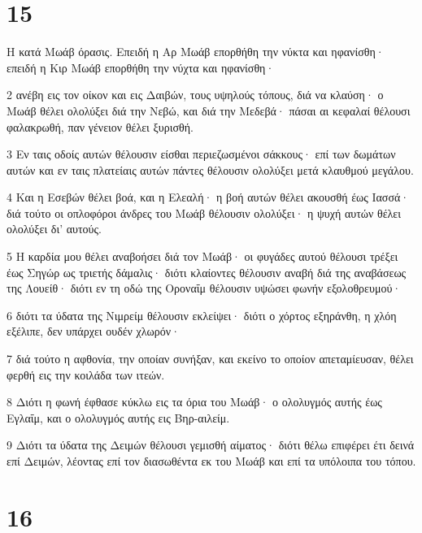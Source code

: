 \chapter{15}

\par Η κατά Μωάβ όρασις. Επειδή η Αρ Μωάβ επορθήθη την νύκτα και ηφανίσθη· επειδή η Κιρ Μωάβ επορθήθη την νύχτα και ηφανίσθη·
\par 2 ανέβη εις τον οίκον και εις Δαιβών, τους υψηλούς τόπους, διά να κλαύση· ο Μωάβ θέλει ολολύξει διά την Νεβώ, και διά την Μεδεβά· πάσαι αι κεφαλαί θέλουσι φαλακρωθή, παν γένειον θέλει ξυρισθή.
\par 3 Εν ταις οδοίς αυτών θέλουσιν είσθαι περιεζωσμένοι σάκκους· επί των δωμάτων αυτών και εν ταις πλατείαις αυτών πάντες θέλουσιν ολολύξει μετά κλαυθμού μεγάλου.
\par 4 Και η Εσεβών θέλει βοά, και η Ελεαλή· η βοή αυτών θέλει ακουσθή έως Ιασσά· διά τούτο οι οπλοφόροι άνδρες του Μωάβ θέλουσιν ολολύξει· η ψυχή αυτών θέλει ολολύξει δι' αυτούς.
\par 5 Η καρδία μου θέλει αναβοήσει διά τον Μωάβ· οι φυγάδες αυτού θέλουσι τρέξει έως Σηγώρ ως τριετής δάμαλις· διότι κλαίοντες θέλουσιν αναβή διά της αναβάσεως της Λουείθ· διότι εν τη οδώ της Οροναΐμ θέλουσιν υψώσει φωνήν εξολοθρευμού·
\par 6 διότι τα ύδατα της Νιμρείμ θέλουσιν εκλείψει· διότι ο χόρτος εξηράνθη, η χλόη εξέλιπε, δεν υπάρχει ουδέν χλωρόν·
\par 7 διά τούτο η αφθονία, την οποίαν συνήξαν, και εκείνο το οποίον απεταμίευσαν, θέλει φερθή εις την κοιλάδα των ιτεών.
\par 8 Διότι η φωνή έφθασε κύκλω εις τα όρια του Μωάβ· ο ολολυγμός αυτής έως Εγλαΐμ, και ο ολολυγμός αυτής εις Βηρ-αιλείμ.
\par 9 Διότι τα ύδατα της Δειμών θέλουσι γεμισθή αίματος· διότι θέλω επιφέρει έτι δεινά επί Δειμών, λέοντας επί τον διασωθέντα εκ του Μωάβ και επί τα υπόλοιπα του τόπου.

\chapter{16}

